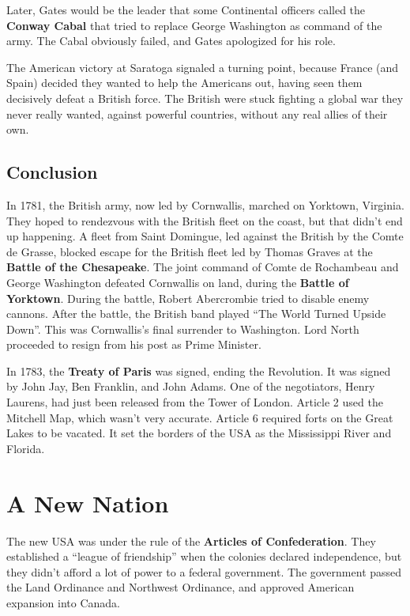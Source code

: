 Later, Gates would be the leader that some Continental officers called the \textbf{Conway Cabal}
that tried to replace George Washington as command of the army.
The Cabal obviously failed, and Gates apologized for his role.

The American victory at Saratoga signaled a turning point,
because France (and Spain) decided they wanted to help the Americans out,
having seen them decisively defeat a British force.
The British were stuck fighting a global war they never really wanted,
against powerful countries, without any real allies of their own.

\subsection*{Conclusion}

In 1781, the British army, now led by Cornwallis, marched on Yorktown, Virginia.
They hoped to rendezvous with the British fleet on the coast,
but that didn't end up happening.
A fleet from Saint Domingue, led against the British by the Comte de Grasse, blocked escape for the
British fleet led by Thomas Graves at the \textbf{Battle of the Chesapeake}.
The joint command of Comte de Rochambeau and George Washington defeated Cornwallis
on land, during the \textbf{Battle of Yorktown}.
During the battle, Robert Abercrombie tried to disable enemy cannons.
After the battle, the British band played ``The World Turned Upside Down''.
This was Cornwallis's final surrender to Washington.
Lord North proceeded to resign from his post as Prime Minister.

In 1783, the \textbf{Treaty of Paris} was signed, ending the Revolution.
It was signed by John Jay, Ben Franklin, and John Adams.
One of the negotiators, Henry Laurens, had just been released from the Tower of London.
Article 2 used the Mitchell Map, which wasn't very accurate.
Article 6 required forts on the Great Lakes to be vacated.
It set the borders of the USA as the Mississippi River and Florida.

\section{A New Nation}

The new USA was under the rule of the \textbf{Articles of Confederation}.
They established a ``league of friendship'' when the colonies declared independence,
but they didn't afford a lot of power to a federal government.
The government passed the Land Ordinance and Northwest Ordinance,
and approved American expansion into Canada.

